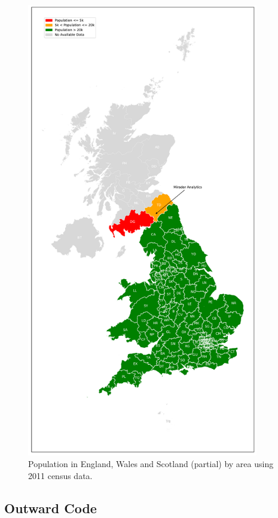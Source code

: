\documentclass{article}
\begin{document}
\newpage

\begin{figure}[H]
    \centering
    \includegraphics[width=0.9\textwidth]{./images/area.pdf}
    \caption{Population in England, Wales and Scotland (partial) by area using 2011 census data.}
    \label{fig:area}
\end{figure}

\subsection{Outward Code}
\end{document}
